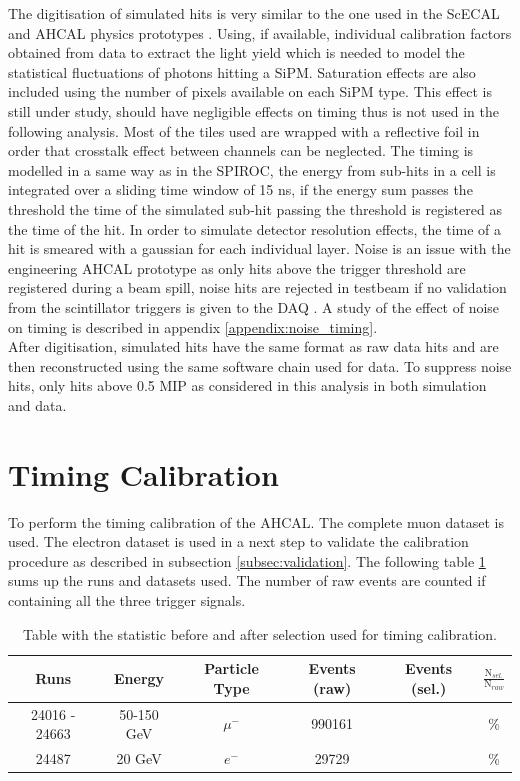 \documentclass[twoside,a4paper,11pt]{article}
\begin{document}
The digitisation of simulated hits is very similar to the one used in the ScECAL and AHCAL physics prototypes \cite{CAN-002, CAN-010, JINST-6}. Using, if available, individual calibration factors obtained from data to extract the light yield which is needed to model the statistical fluctuations of photons hitting a SiPM. Saturation effects are also included using the number of pixels available on each SiPM type. This effect is still under study, should have negligible effects on timing thus is not used in the following analysis. Most of the tiles used are wrapped with a reflective foil in order that crosstalk effect between channels can be neglected. The timing is modelled in a same way as in the SPIROC, the energy from sub-hits in a cell is integrated over a sliding time window of 15 ns, if the energy sum passes the threshold the time of the simulated sub-hit passing the threshold is registered as the time of the hit. In order to simulate detector resolution effects, the time of a hit is smeared with a gaussian for each individual layer. Noise is an issue with the engineering AHCAL prototype as only hits above the trigger threshold are registered during a beam spill, noise hits are rejected in testbeam if no validation from the scintillator triggers is given to the DAQ \cite{DAQ}. A study of the effect of noise on timing is described in appendix \ref{appendix:noise_timing}.\\
After digitisation, simulated hits have the same format as raw data hits and are then reconstructed using the same software chain used for data. To suppress noise hits, only hits above 0.5 MIP as considered in this analysis in both simulation and data.

\section{Timing Calibration}
To perform the timing calibration of the AHCAL. The complete muon dataset is used. The electron dataset is used in a next step to validate the calibration procedure as described in subsection \ref{subsec:validation}. The following table \ref{table:mu_elec_runs} sums up the runs and datasets used. The number of raw events are counted if containing all the three trigger signals.
\begin{table}[htbp]
\centering
  \begin{tabular}{@{} cccccc @{}}
    \hline
    Runs & Energy & Particle Type & Events (raw) & Events (sel.) & $\frac{\text{N$_{sel.}$}}{\text{N$_{raw}$}}$ \\ 
    \hline
     24016 - 24663 & 50-150 GeV & $\mu^-$ & 990161 & & \% \\ 
     24487 & 20 GeV & $e^-$ & 29729 & & \% \\
    \hline
  \end{tabular}
  \caption{Table with the statistic before and after selection used for timing calibration.}
  \label{table:mu_elec_runs}
\end{table}
\end{document}
